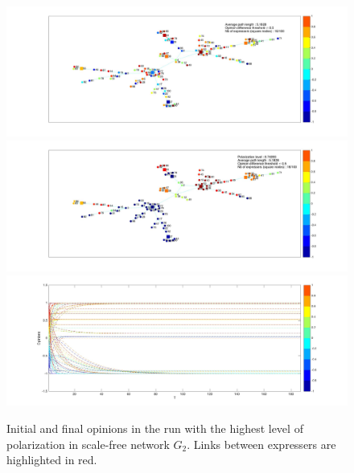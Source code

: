 \documentclass{article}
\begin{document}
\begin{figure}[]
\includegraphics[scale=0.25]{img/SF_IO_A6_max.jpg}
\quad 
\includegraphics[scale=0.25]{img/SF_FO_A6_max.jpg}
\quad
\includegraphics[scale=0.25]{img/SF_evolution_A6_max.jpg}
\caption{Initial and final opinions in the run with the highest level of polarization in scale-free network $G_2$. Links between expressers are highlighted in red.}
\label{A6_highest}
\end{figure}
\end{document}
